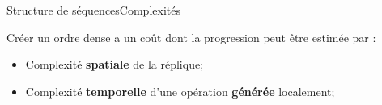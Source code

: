 \begin{frame}{Structure de séquences}{Complexités}

Créer un ordre dense a un coût dont la progression peut être estimée par : 

\vspace{0.5cm}

\begin{itemize}
\item Complexité \textbf{spatiale} de la réplique;
\item Complexité \textbf{temporelle} d'une opération \textbf{générée} localement;
\end{itemize}

\end{frame}








%     


